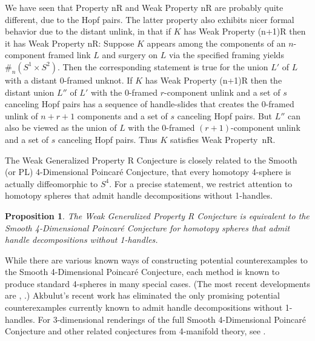 \documentclass{amsart}
\newtheorem{prop}[thm]{Proposition}
\begin{document}
 We have seen that Property nR and Weak Property nR are probably quite different, due to the Hopf pairs. The latter property also exhibits nicer formal behavior due to the distant unlink, in that if $K$ has Weak Property (n+1)R then it has Weak Property nR:  Suppose $K$ appears among the components of an $n$-component framed link $L$ and surgery on $L$ via the specified framing yields $\#_{n} (S^{1} \times S^{2})$. Then the corresponding statement is true for the union $L'$ of $L$ with a distant $0$-framed unknot.  If $K$ has Weak Property (n+1)R then the distant union $L''$ of $L'$ with the $0$-framed $r$-component unlink and a set of $s$ canceling Hopf pairs has a sequence of handle-slides that creates the $0$-framed unlink of $n + r + 1$ components and a set of $s$ canceling Hopf pairs.  But $L''$ can also be viewed as the union of $L$ with the $0$-framed $(r+1)$-component unlink and a set of $s$  canceling Hopf pairs. Thus $K$ satisfies Weak Property~nR.

The Weak Generalized Property R Conjecture is closely related to the Smooth (or PL) 4-Dimensional Poincar\'e Conjecture, that every homotopy 4-sphere is actually diffeomorphic to $S^4$. For a precise statement, we restrict attention to homotopy spheres that admit handle decompositions without 1-handles.

\begin{prop}  The Weak Generalized Property R Conjecture is equivalent to the Smooth 4-Dimensional Poincar\'e Conjecture for homotopy spheres that admit handle decompositions without 1-handles.
\end{prop}

While there are various known ways of constructing potential counterexamples to the Smooth 4-Dimensional Poincar\'e Conjecture, each method is known to produce standard 4-spheres in many special cases. (The most recent developments are \cite{Ak}, \cite{Go2}.) Akbulut's recent work \cite{Ak} has eliminated the only promising potential counterexamples currently known to admit handle decompositions without 1-handles. For 3-dimensional renderings of the full Smooth 4-Dimensional Poincar\'e Conjecture and other related conjectures from 4-manifold theory, see \cite{FGMW}.
\end{document}
